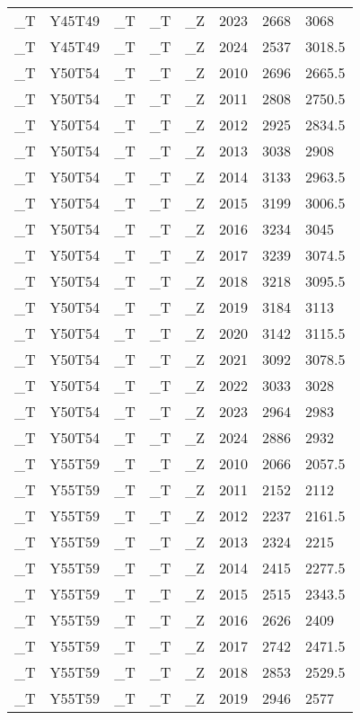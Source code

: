 \begin{longtable}[t]{llllllll}
\_T & Y45T49 & \_T & \_T & \_Z & 2023 & 2668 & 3068\\
\_T & Y45T49 & \_T & \_T & \_Z & 2024 & 2537 & 3018.5\\
\addlinespace
\_T & Y50T54 & \_T & \_T & \_Z & 2010 & 2696 & 2665.5\\
\_T & Y50T54 & \_T & \_T & \_Z & 2011 & 2808 & 2750.5\\
\_T & Y50T54 & \_T & \_T & \_Z & 2012 & 2925 & 2834.5\\
\_T & Y50T54 & \_T & \_T & \_Z & 2013 & 3038 & 2908\\
\_T & Y50T54 & \_T & \_T & \_Z & 2014 & 3133 & 2963.5\\
\addlinespace
\_T & Y50T54 & \_T & \_T & \_Z & 2015 & 3199 & 3006.5\\
\_T & Y50T54 & \_T & \_T & \_Z & 2016 & 3234 & 3045\\
\_T & Y50T54 & \_T & \_T & \_Z & 2017 & 3239 & 3074.5\\
\_T & Y50T54 & \_T & \_T & \_Z & 2018 & 3218 & 3095.5\\
\_T & Y50T54 & \_T & \_T & \_Z & 2019 & 3184 & 3113\\
\addlinespace
\_T & Y50T54 & \_T & \_T & \_Z & 2020 & 3142 & 3115.5\\
\_T & Y50T54 & \_T & \_T & \_Z & 2021 & 3092 & 3078.5\\
\_T & Y50T54 & \_T & \_T & \_Z & 2022 & 3033 & 3028\\
\_T & Y50T54 & \_T & \_T & \_Z & 2023 & 2964 & 2983\\
\_T & Y50T54 & \_T & \_T & \_Z & 2024 & 2886 & 2932\\
\addlinespace
\_T & Y55T59 & \_T & \_T & \_Z & 2010 & 2066 & 2057.5\\
\_T & Y55T59 & \_T & \_T & \_Z & 2011 & 2152 & 2112\\
\_T & Y55T59 & \_T & \_T & \_Z & 2012 & 2237 & 2161.5\\
\_T & Y55T59 & \_T & \_T & \_Z & 2013 & 2324 & 2215\\
\_T & Y55T59 & \_T & \_T & \_Z & 2014 & 2415 & 2277.5\\
\addlinespace
\_T & Y55T59 & \_T & \_T & \_Z & 2015 & 2515 & 2343.5\\
\_T & Y55T59 & \_T & \_T & \_Z & 2016 & 2626 & 2409\\
\_T & Y55T59 & \_T & \_T & \_Z & 2017 & 2742 & 2471.5\\
\_T & Y55T59 & \_T & \_T & \_Z & 2018 & 2853 & 2529.5\\
\_T & Y55T59 & \_T & \_T & \_Z & 2019 & 2946 & 2577\\

\end{longtable}
